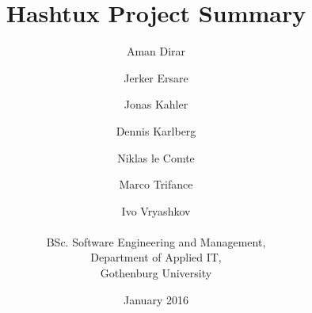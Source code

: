 \title{Hashtux Project Summary}
\author{Aman Dirar \and Jerker Ersare \and Jonas Kahler \and Dennis Karlberg
        \and Niklas le Comte \and Marco Trifance \and Ivo Vryashkov \\ \\
        BSc. Software Engineering and Management, \\
        Department of Applied IT, \\ Gothenburg University}
\date{January 2016}
\maketitle

